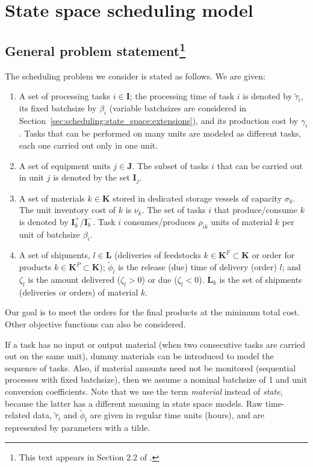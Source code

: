 \section{State space scheduling model}
\label{sec:scheduling:state_space}

\subsection{General problem statement\footnote{ This text appears in Section 2.2 of
\citet{subramanian:maravelias:rawlings:2012}.}}


The scheduling problem we consider is stated as follows. We are given:
\begin{enumerate}
\item A set of processing tasks $i \in \mathbf{I}$; the processing time of
task $i$ is denoted by $\tilde{\tau}_i$, its fixed batchsize by
$\beta_i$ (variable batchsizes are considered in
Section~\ref{sec:scheduling:state_space:extensions}), and its production
cost by $\gamma_i$. Tasks that can be performed on many units are
modeled as different tasks, each one carried out only in one unit.
\item A set of equipment units $j \in \mathbf{J}$. The subset of tasks
  $i$ that can be carried out in unit $j$ is denoted by the set
  $\mathbf{I}_j$.
\item A set of materials $k \in \mathbf{K}$ stored in dedicated
  storage vessels of capacity $\sigma_k$. The unit inventory cost of
  $k$ is $\nu_k$. The set of tasks $i$ that produce/consume $k$ is
  denoted by $\mathbf{I}_k^+$/$\mathbf{I}_k^{-}$. Task $i$
  consumes/produces $\rho_{ik}$ units of material $k$ per unit of
  batchsize $\beta_i$. 
\item A set of shipments, $l \in \mathbf{L}$ (deliveries of feedstocks
  $k \in \mathbf{K}^F \subset \mathbf{K}$ or order for products $k \in
  \mathbf{K}^P \subset \mathbf{K}$); $\tilde{\phi}_l$ is the release
  (due) time of delivery (order) $l$; and $\zeta_l$ is the amount
  delivered ($\zeta_l > 0$) or due ($\zeta_l < 0$). $\mathbf{L}_k$ is
  the set of shipments (deliveries or orders) of material $k$. 
\end{enumerate}

Our goal is to meet the orders for the final products at the minimum
total cost. Other objective functions can also be considered.

If a task has no input or output material (\eg when two consecutive
tasks are carried out on the same unit), dummy materials can be
introduced to model the sequence of tasks. Also, if material amounts
need not be monitored (\eg sequential processes with fixed batchsize),
then we assume a nominal batchsize of 1 and unit conversion
coefficients. Note that we use the term {\emph{material}} instead of
{\emph{state}}, because the latter has a different meaning in
state space models. Raw time-related data, $\tilde{\tau}_i$ and
$\tilde{\phi}_l$ are given in regular time units (\eg hours), and are
represented by parameters with a tilde.

